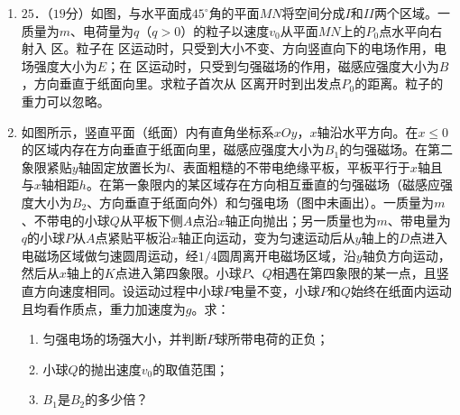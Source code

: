 \begin{enumerate}[leftmargin=0em]
{\begin{enumerate}
\end{enumerate}
}



\newpage
\item
{}
$ 25 $．（$ 19 $分）如图，与水平面成$ 45 ^{ \circ } $角的平面$ MN $将空间分成$ I $和$ II $两个区域。一质量为$ m $、电荷量为$ q $（$ q>0 $）的粒子以速度$ v_{0} $从平面$ MN $上的$ P_{0} $点水平向右射入  区。粒子在  区运动时，只受到大小不变、方向竖直向下的电场作用，电场强度大小为$ E $；在  区运动时，只受到匀强磁场的作用，磁感应强度大小为$ B $，方向垂直于纸面向里。求粒子首次从  区离开时到出发点$ P_{0} $的距离。粒子的重力可以忽略。

\begin{figure}[h!]
\flushright

\end{figure}



\newpage
\item
{}
如图所示，竖直平面（纸面）内有直角坐标系$ xOy $，$ x $轴沿水平方向。在$ x \leq 0 $的区域内存在方向垂直于纸面向里，磁感应强度大小为$ B_{1} $的匀强磁场。在第二象限紧贴$ y $轴固定放置长为$ l $、表面粗糙的不带电绝缘平板，平板平行于$ x $轴且与$ x $轴相距$ h $。在第一象限内的某区域存在方向相互垂直的匀强磁场（磁感应强度大小为$ B_{2} $、方向垂直于纸面向外）和匀强电场（图中未画出）。一质量为$ m $、不带电的小球$ Q $从平板下侧$ A $点沿$ x $轴正向抛出；另一质量也为$ m $、带电量为$ q $的小球$ P $从$ A $点紧贴平板沿$ x $轴正向运动，变为匀速运动后从$ y $轴上的$ D $点进入电磁场区域做匀速圆周运动，经$ 1/4 $圆周离开电磁场区域，沿$ y $轴负方向运动，然后从$ x $轴上的$ K $点进入第四象限。小球$ P $、$ Q $相遇在第四象限的某一点，且竖直方向速度相同。设运动过程中小球$ P $电量不变，小球$ P $和$ Q $始终在纸面内运动且均看作质点，重力加速度为$ g $。求：
\begin{enumerate}
\renewcommand{\labelenumi}{\arabic{enumi}.}
\item
匀强电场的场强大小，并判断$ P $球所带电荷的正负；
\item 
小球$ Q $的抛出速度$ v_{0} $的取值范围；
\item 
$ B_{1} $是$ B_{2} $的多少倍？






\end{enumerate}
\end{enumerate}
